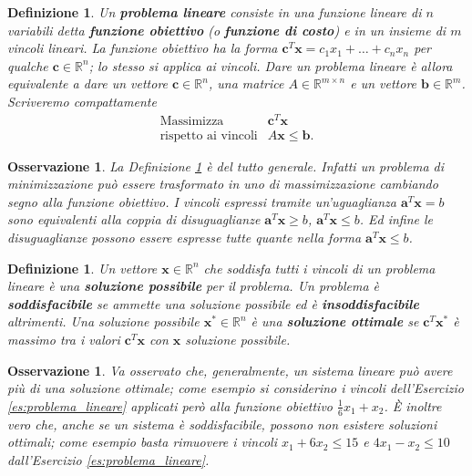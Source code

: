 \documentclass[italian, letter paper, 12pt, reqno]{article}
\theoremstyle{myteo}
\newtheorem{definition}[theorem]{Definizione}
\newtheorem{remark}[theorem]{Osservazione}
\numberwithin{equation}{section}
\begin{document}
\begin{definition}
  \label{def:problema_lineare}
  Un \textbf{problema lineare} consiste in una funzione lineare di \(n\) variabili detta \textbf{funzione obiettivo} (o \textbf{funzione di costo}) e in un insieme di \(m\) vincoli lineari.
  La funzione obiettivo ha la forma \(\mathbf{c}^T\mathbf{x} = c_1x_1+\ldots+c_nx_n\) per qualche \(\mathbf{c}\in\mathbb{R}^n\); lo stesso si applica ai vincoli.
  Dare un problema lineare è allora equivalente a dare un vettore \(\mathbf{c}\in\mathbb{R}^n\), una matrice \(A\in\mathbb{R}^{m\times n}\) e un vettore \(\mathbf{b}\in\mathbb{R}^m\).
  Scriveremo compattamente
  \begin{equation*}
    \begin{array}{ll}
      \text{Massimizza} & \mathbf{c}^T\mathbf{x}\\
      \text{rispetto ai vincoli} & A\mathbf{x}\leq\mathbf{b}.
    \end{array}
  \end{equation*}
\end{definition}

\begin{remark}
  \label{oss:definizione_generale}
  La Definizione \ref{def:problema_lineare} è del tutto generale.
  Infatti un problema di minimizzazione può essere trasformato in uno di massimizzazione cambiando segno alla funzione obiettivo.
  I vincoli espressi tramite un'uguaglianza \(\mathbf{a}^T\mathbf{x}=b\) sono equivalenti alla coppia di disuguaglianze \(\mathbf{a}^T\mathbf{x}\geq b\), \(\mathbf{a}^T\mathbf{x}\leq b\).
  Ed infine le disuguaglianze possono essere espresse tutte quante nella forma \(\mathbf{a}^T\mathbf{x}\leq b\).
\end{remark}

\begin{definition}
  \label{def:soluzioni}
  Un vettore \(\mathbf{x}\in\mathbb{R}^n\) che soddisfa tutti i vincoli di un problema lineare è una \textbf{soluzione possibile} per il problema.
  Un problema è \textbf{soddisfacibile} se ammette una soluzione possibile ed è \textbf{insoddisfacibile} altrimenti. Una soluzione possibile \(\mathbf{x}^*\in\mathbb{R}^n\) è una \textbf{soluzione ottimale} se \(\mathbf{c}^T\mathbf{x}^*\) è massimo tra i valori \(\mathbf{c}^T\mathbf{x}\) con \(\mathbf{x}\) soluzione possibile.
\end{definition}

\begin{remark}
  \label{oss:soluzioni_ottimali_illimitate}
  Va osservato che, generalmente, un sistema lineare può avere più di una soluzione ottimale; come esempio si considerino i vincoli dell'Esercizio \ref{es:problema_lineare} applicati però alla funzione obiettivo \(\frac{1}{6}x_1+x_2\).
  È inoltre vero che, anche se un sistema è soddisfacibile, possono non esistere soluzioni ottimali; come esempio basta rimuovere i vincoli \(x_1+6x_2\leq15\) e \(4x_1-x_2\leq10\) dall'Esercizio \ref{es:problema_lineare}.
\end{remark}
\end{document}
